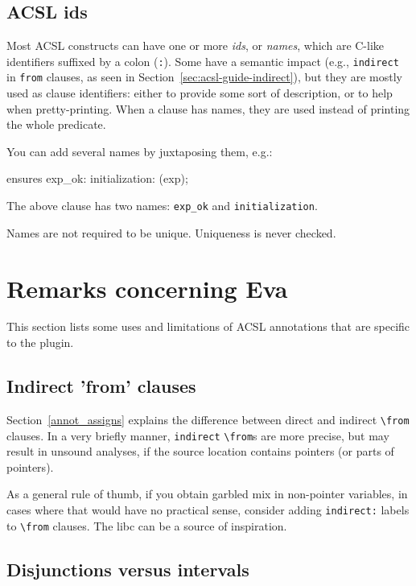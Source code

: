 \documentclass{frama-c-book}
\begin{document}
\subsection*{ACSL ids}

Most ACSL constructs can have one or more {\em ids}, or {\em names}, which are
C-like identifiers suffixed by a colon (\texttt{:}).
Some have a semantic impact (e.g., \texttt{indirect} in \texttt{from} clauses,
as seen in Section~\ref{sec:acsl-guide-indirect}),
but they are mostly used as clause identifiers: either to
provide some sort of description, or to help when pretty-printing.
When a clause has names, they are used instead of printing the whole predicate.

You can add several names by juxtaposing them, e.g.:

\begin{listing-nonumber}
  ensures exp_ok: initialization: \initialized(exp);
\end{listing-nonumber}

The above clause has two names: \verb+exp_ok+ and \verb+initialization+.

Names are not required to be unique. Uniqueness is never checked.

\section{Remarks concerning Eva}

This section lists some uses and limitations of ACSL annotations that are
specific to the \Eva{} plugin.

\subsection*{Indirect 'from' clauses}
\label{sec:acsl-guide-indirect}

Section~\ref{annot_assigns} explains the difference between direct
and indirect \verb+\from+ clauses. In a very briefly manner,
\texttt{indirect} \verb+\from+s are more precise, but may result
in unsound analyses, if the source location contains pointers
(or parts of pointers).

As a general rule of thumb, if you obtain garbled mix in non-pointer
variables, in cases where that would have no practical sense, consider
adding \texttt{indirect:} labels to \verb+\from+ clauses. The \FramaC
libc can be a source of inspiration.

\subsection*{Disjunctions versus intervals}
\end{document}
